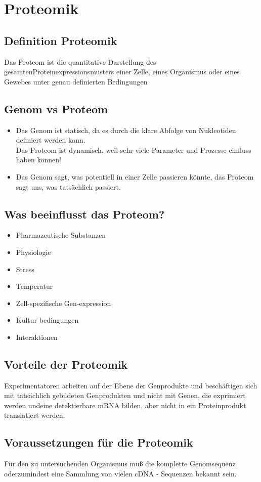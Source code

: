 

\section{Proteomik}
\subsection{Definition Proteomik} 
Das Proteom ist die quantitative Darstellung des gesamtenProteinexpressionsmusters einer Zelle, eines Organismus
oder eines Gewebes unter genau definierten Bedingungen
\subsection{Genom vs Proteom}
\begin{itemize}
    \item Das Genom ist statisch, da es durch die klare Abfolge von Nukleotiden definiert werden kann. \\
    Das Proteom ist dynamisch, weil sehr viele Parameter und Prozesse einfluss haben können!
    \item Das Genom sagt, was potentiell in einer Zelle passieren könnte, das Proteom sagt uns, was tatsächlich passiert.
\end{itemize}
\subsection{Was beeinflusst das Proteom?} 
\begin{itemize}
    \item Pharmazeutische Substanzen
    \item Physiologie
    \item Stress
    \item Temperatur
    \item Zell-spezifische Gen-expression
    \item Kultur bedingungen
    \item Interaktionen
\end{itemize}
\subsection{Vorteile der Proteomik}
Experimentatoren arbeiten auf der Ebene der Genprodukte und beschäftigen sich mit
tatsächlich gebildeten Genprodukten und nicht mit Genen, die exprimiert werden undeine detektierbare mRNA bilden, aber nicht in ein Proteinprodukt translatiert werden.
\subsection{Voraussetzungen für die Proteomik}
Für den zu untersuchenden Organismus muß die komplette Genomsequenz oderzumindest eine Sammlung von vielen cDNA - Sequenzen bekannt sein.
